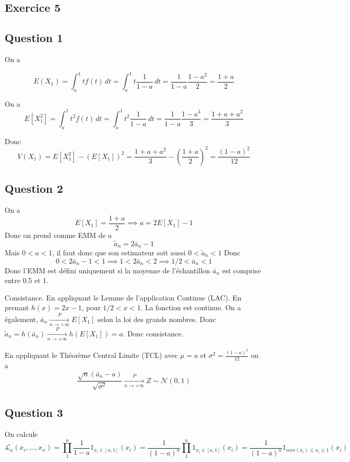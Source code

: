\documentclass[]{book}
\theoremstyle{definition}
\begin{document}
\subsection*{Exercice 5}
\subsection*{Question 1}
On a

$$
E(X_1) = \int_{a}^{1}{t f(t) \,dt} = \int_{a}^{1}{t\frac{1}{1-a} \,dt} = \frac{1}{1-a}\frac{1-a^2}{2} = \frac{1+a}{2}
$$

On a
$$
E[X_1^2] = \int_{a}^{1}{t^2 f(t) \,dt} = \int_{a}^{1}{t^2\frac{1}{1-a} \,dt} = \frac{1}{1-a}\frac{1-a^3}{3} = \frac{1+a+a^2}{3}
$$

Donc
$$
V(X_1) = E[X_1^2]−(E[X_1])^2 = \frac{1+a+a^2}{3} -  \left( \frac{1+a}{2} \right)^2 = \frac{(1-a)^2}{12}
$$

\subsection*{Question 2}
On a
$$E[X_1] = \frac{1+a}{2} \implies a = 2E[X_1] - 1$$
Donc on prend comme EMM de $a$
$$
\tilde{a}_n = 2 \bar{a}_n - 1
$$
Mais $0 < a <1$, il faut donc que son estimateur soit aussi $0 < \tilde{a}_n <1$
Donc 
$$
0 < 2\bar{a}_n - 1 < 1 \implies 1 < 2\bar{a}_n < 2 \implies 1/2 < \bar{a}_n < 1
$$
Donc l'EMM est d\'efini uniquement si la moyenne de l'\'echantillon $\bar{a}_n$ est comprise entre 0.5 et 1. 

Consistance. En appliquant le Lemme de l'application Continue (LAC).
En prenant $h(x) = 2 x - 1$, pour $1/2 < x <1$. La fonction est continue. On a \'egalement, $\bar{a}_n \xrightarrow[n \to +\infty]{P} E[X_1]$ selon la loi des grands nombres. Donc $\tilde{a}_n = h(\bar{a}_n) \xrightarrow[n \to +\infty]{P} h(E[X_1]) = a$. Donc consistance.

En appliquant le Th\'eor\`eme Central Limite (TCL) avec $\mu = a$ et $\sigma^2 = \frac{(1-a)^2}{12}$ on a  
$$
\frac{\sqrt{n}(\bar{a}_n - a)}{\sqrt{\sigma^2}} \xrightarrow[n \to +\infty]{P} Z \sim \mathcal{N}(0,1)
$$

\subsection*{Question 3}
On calcule
$$
\mathcal{L}_a(x_i,\ldots,x_n) = \prod_{1}^{n}{\frac{1}{1-a}}1_{x_i \in [a,1]}(x_i) =
\frac{1}{(1-a)^n}\prod_{1}^{n}{1_{x_i \in [a,1]}(x_i)} = \frac{1}{(1-a)^n}{1_{min(x_i) \leq x_i \leq 1}(x_i)}
$$
\end{document}
